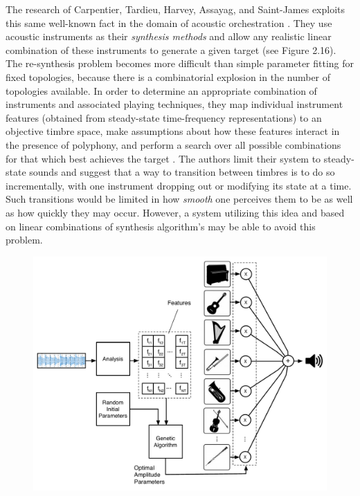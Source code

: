 \documentclass[a4paper,12pt]{report} 	%
\numberwithin{figure}{chapter}
\numberwithin{table}{chapter}
\numberwithin{equation}{chapter}
\begin{document}
\begin{flushleft}
The research of Carpentier, Tardieu, Harvey, Assayag, and Saint-James exploits this same well-known fact in the domain of acoustic orchestration \cite{Carpentier:2010fh}. They use acoustic instruments as their \emph{synthesis methods} and allow any realistic linear combination of these instruments to generate a given target (see Figure 2.16). The re-synthesis problem becomes more difficult than simple parameter fitting for fixed topologies, because there is a combinatorial explosion in the number of topologies available. In order to determine an appropriate combination of instruments and associated playing techniques, they map individual instrument features (obtained from steady-state time-frequency representations) to an objective timbre space, make assumptions about how these features interact in the presence of polyphony, and perform a search over all possible combinations for that which best achieves the target \cite[p. 2]{Carpentier:2010fh}. The authors limit their system to steady-state sounds and suggest that a way to transition between timbres is to do so incrementally, with one instrument dropping out or modifying its state at a time. Such transitions would be limited in how \emph{smooth} one perceives them to be as well as how quickly they may occur. However, a system utilizing this idea and based on linear combinations of synthesis algorithm's may be able to avoid this problem.
\\
\begin{figure}[h!]
\begin{center}
\includegraphics[scale=0.55]{OrchestralMetaSynthesis}

\end{center}
\end{figure}
\end{flushleft}
\end{document}
